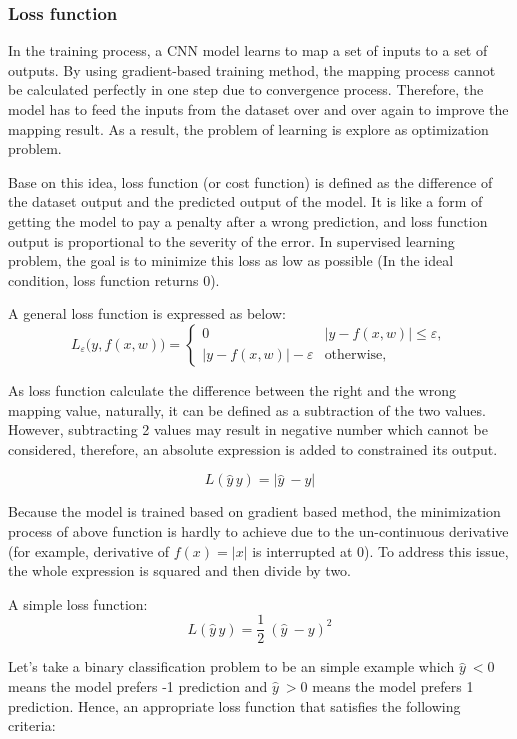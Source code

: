 \subsubsection{Loss function}
\noindent

	In the training process, a CNN model learns to map a set of inputs to a set of outputs. By using gradient-based training method, the mapping process cannot be calculated perfectly in one step due to convergence process. Therefore, the model has to feed the inputs from the dataset over and over again to improve the mapping result. As a result, the problem of learning is explore as optimization problem. 
	
	Base on this idea, loss function (or cost function) is defined as the difference of the dataset output and the predicted output of the model. It is like a form of getting the model to pay a penalty after a wrong prediction, and loss function output is proportional to the severity of the error. In supervised learning problem, the goal is to minimize this loss as low as possible (In the ideal condition, loss function returns 0).
	
	A general loss function is expressed as below:
	\[
	L_\varepsilon\bigl(y,f(x,w)\bigr)=
	\begin{cases}
	0 & \bigl|y-f(x,w)\bigr|\leq\varepsilon,\\
	\bigl|y-f(x,w)\bigr|-\varepsilon & \text{otherwise},
	\end{cases}
	\]
	
	As loss function calculate the difference between the right and the wrong mapping value, naturally, it can be defined as a subtraction of the two values. However, subtracting 2 values may result in negative number which cannot be considered, therefore, an absolute expression is added to constrained its output.
	
	\[L(\hat{y}\,y) = | \hat{y}\ - y | \]
	
	Because the model is trained based on gradient based method, the minimization process of above function is hardly to achieve due to the un-continuous derivative (for example, derivative of $f(x) = |x|$ is interrupted at 0). To address this issue, the whole expression is squared and then divide by two.
	
	A simple loss function:
	\[L(\hat{y}\,y) = \frac{1}{2}\ (\hat{y}\ - y)^2 \]
	
	Let's take a binary classification problem to be an simple example which $\hat{y}\ < 0$ means the model prefers -1 prediction and $\hat{y}\ > 0$ means the model prefers 1 prediction. Hence, an appropriate loss function that satisfies the following criteria:
	

